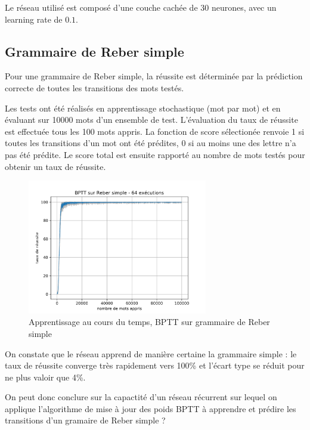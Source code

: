 \smallskip

Le réseau utilisé est composé d'une couche cachée de 30 neurones, avec un learning
rate de $0.1$.

\subsection{Grammaire de Reber simple}
Pour une grammaire de Reber simple, la réussite est déterminée par la prédiction
correcte de toutes les transitions des mots testés.

\medskip

Les tests ont été réalisés en apprentissage stochastique (mot par mot) et en
évaluant sur 10000 mots d'un ensemble de test. L'évaluation du taux de réussite
est effectuée tous les 100 mots appris. La fonction de score sélectionée renvoie
1 si toutes les transitions d'un mot ont été prédites, 0 si au moins une des
lettre n'a pas été prédite. Le score total est ensuite rapporté au nombre de
mots testés pour obtenir un taux de réussite.


\begin{figure}[!ht]
\begin{center}
\includegraphics[width=0.7\textwidth]{images/results/bptt_simplereber_ls30_lr01.png}
\caption{Apprentissage au cours du temps, BPTT sur grammaire de Reber simple}
\end{center}
\end{figure}

\medskip

On constate que le réseau apprend de manière certaine la grammaire simple : 
le taux de réussite converge très rapidement vers 100\% et l'écart type
se réduit pour ne plus valoir que 4\%.

\medskip

On peut donc conclure sur la capactité d'un réseau récurrent sur lequel on
applique l'algorithme de mise à jour des poids BPTT à apprendre et prédire les
transitions d'un gramaire de Reber simple ?

